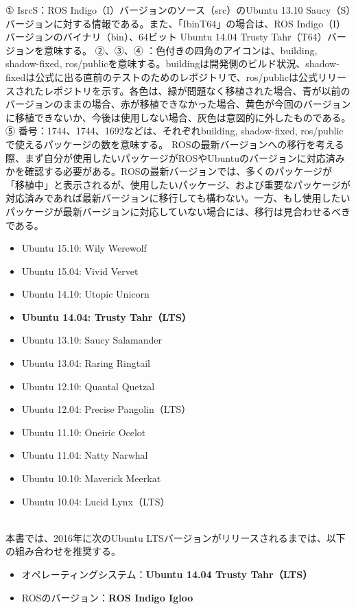 ① IsrcS：ROS Indigo（I）バージョンのソース（src）のUbuntu 13.10 Saucy（S）バージョンに対する情報である。また、「IbinT64」の場合は、ROS Indigo（I）バージョンのバイナリ（bin）、64ビット Ubuntu 14.04 Trusty Tahr（T64）バージョンを意味する。
②、③、④ ：色付きの四角のアイコンは、building, shadow-fixed, ros/publicを意味する。buildingは開発側のビルド状況、shadow-fixedは公式に出る直前のテストのためのレポジトリで、ros/publicは公式リリースされたレポジトリを示す。各色は、緑が問題なく移植された場合、青が以前のバージョンのままの場合、赤が移植できなかった場合、黄色が今回のバージョンに移植できないか、今後は使用しない場合、灰色は意図的に外したものである。
⑤ 番号：1744、1744、1692などは、それぞれbuilding, shadow-fixed, ros/publicで使えるパッケージの数を意味する。
ROSの最新バージョンへの移行を考える際、まず自分が使用したいパッケージがROSやUbuntuのバージョンに対応済みかを確認する必要がある。ROSの最新バージョンでは、多くのパッケージが「移植中」と表示されるが、使用したいパッケージ、および重要なパッケージが対応済みであれば最新バージョンに移行しても構わない。一方、もし使用したいパッケージが最新バージョンに対応していない場合には、移行は見合わせるべきである。
\\
\begin{itemize}
\item Ubuntu 15.10: Wily Werewolf
\item Ubuntu 15.04: Vivid Vervet
\item Ubuntu 14.10: Utopic Unicorn
\item \textbf{Ubuntu 14.04: Trusty Tahr（LTS）}
\item Ubuntu 13.10: Saucy Salamander
\item Ubuntu 13.04: Raring Ringtail
\item Ubuntu 12.10: Quantal Quetzal
\item Ubuntu 12.04: Precise Pangolin（LTS）
\item Ubuntu 11.10: Oneiric Ocelot
\item Ubuntu 11.04: Natty Narwhal
\item Ubuntu 10.10: Maverick Meerkat
\item Ubuntu 10.04: Lucid Lynx（LTS）
\end{itemize}
\\
本書では、2016年に次のUbuntu LTSバージョンがリリースされるまでは、以下の組み合わせを推奨する。

\begin{itemize}
\item オペレーティングシステム：\textbf{Ubuntu 14.04 Trusty Tahr（LTS）}
\item ROSのバージョン：\textbf{ROS Indigo Igloo}
\end{itemize}


